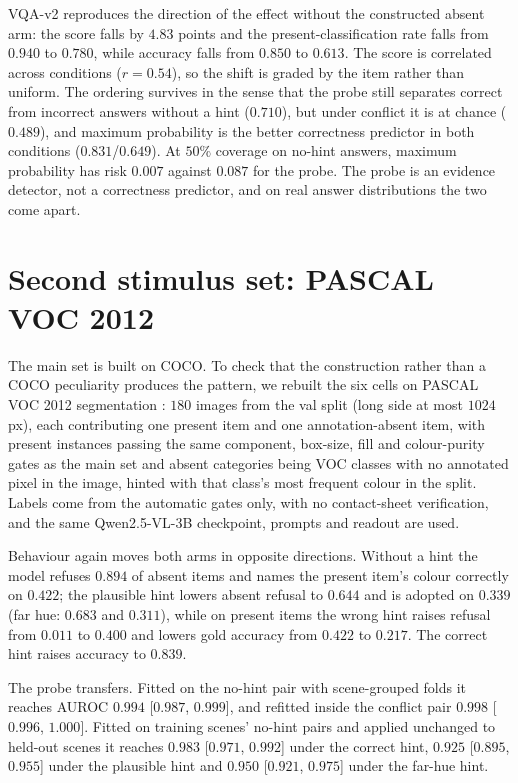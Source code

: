 \documentclass[10pt]{article}
\begin{document}
VQA-v2 reproduces the direction of the effect without the constructed absent arm: the score falls by $4.83$ points and the present-classification rate falls from $0.940$ to $0.780$, while accuracy falls from $0.850$ to $0.613$. The score is correlated across conditions ($r=0.54$), so the shift is graded by the item rather than uniform. The ordering survives in the sense that the probe still separates correct from incorrect answers without a hint ($0.710$), but under conflict it is at chance ($0.489$), and maximum probability is the better correctness predictor in both conditions ($0.831$/$0.649$). At $50\%$ coverage on no-hint answers, maximum probability has risk $0.007$ against $0.087$ for the probe. The probe is an evidence detector, not a correctness predictor, and on real answer distributions the two come apart.

\section{Second stimulus set: PASCAL VOC 2012}
\label{app:voc}

The main set is built on COCO. To check that the construction rather than a COCO peculiarity produces the pattern, we rebuilt the six cells on PASCAL VOC 2012 segmentation \citep{everingham2010pascal}: $180$ images from the val split (long side at most $1024$ px), each contributing one present item and one annotation-absent item, with present instances passing the same component, box-size, fill and colour-purity gates as the main set and absent categories being VOC classes with no annotated pixel in the image, hinted with that class's most frequent colour in the split. Labels come from the automatic gates only, with no contact-sheet verification, and the same Qwen2.5-VL-3B checkpoint, prompts and readout are used.

Behaviour again moves both arms in opposite directions. Without a hint the model refuses $0.894$ of absent items and names the present item's colour correctly on $0.422$; the plausible hint lowers absent refusal to $0.644$ and is adopted on $0.339$ (far hue: $0.683$ and $0.311$), while on present items the wrong hint raises refusal from $0.011$ to $0.400$ and lowers gold accuracy from $0.422$ to $0.217$. The correct hint raises accuracy to $0.839$.

The probe transfers. Fitted on the no-hint pair with scene-grouped folds it reaches AUROC $0.994$ [$0.987$, $0.999$], and refitted inside the conflict pair $0.998$ [$0.996$, $1.000$]. Fitted on training scenes' no-hint pairs and applied unchanged to held-out scenes it reaches $0.983$ [$0.971$, $0.992$] under the correct hint, $0.925$ [$0.895$, $0.955$] under the plausible hint and $0.950$ [$0.921$, $0.975$] under the far-hue hint.
\end{document}
